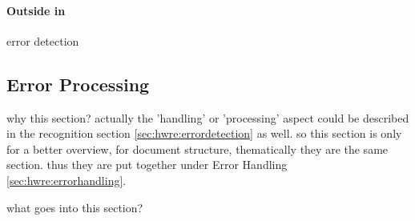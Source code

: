 \paragraph{Outside in} error detection 




\subsection{Error Processing}
\label{sec:hwre:errorprocessing}


why this section? 
actually the 'handling' or 'processing' aspect could be 
described in the recognition section \ref{sec:hwre:errordetection} as well.
so this section is only for a better overview, for document structure, 
thematically they are the same section. thus they are put together under
Error Handling \ref{sec:hwre:errorhandling}.

what goes into this section?

